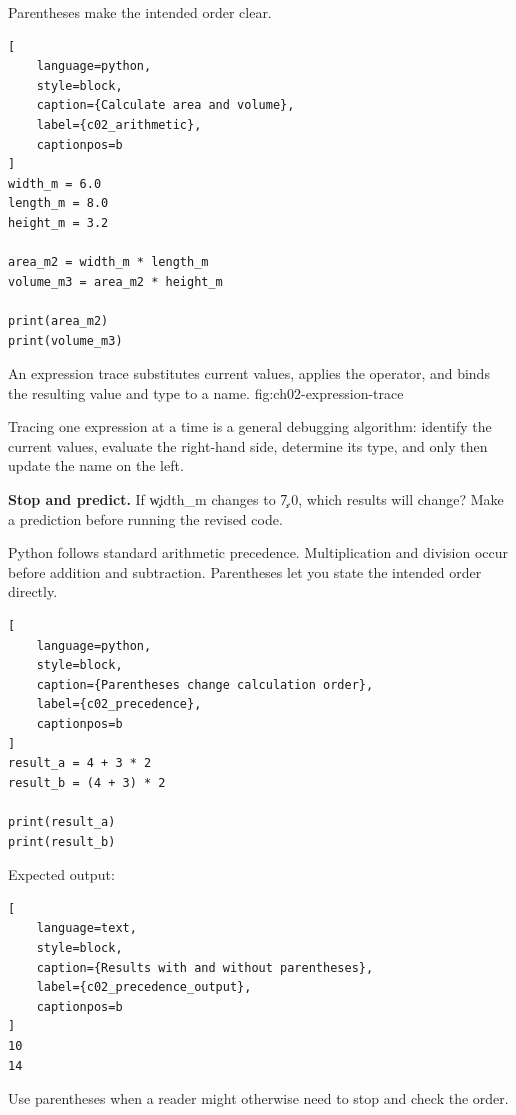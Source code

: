 Parentheses make the intended order clear.

\begin{lstlisting}[
    language=python,
    style=block,
    caption={Calculate area and volume},
    label={c02_arithmetic},
    captionpos=b
]
width_m = 6.0
length_m = 8.0
height_m = 3.2

area_m2 = width_m * length_m
volume_m3 = area_m2 * height_m

print(area_m2)
print(volume_m3)
\end{lstlisting}

{An expression trace substitutes current values, applies the operator, and binds the resulting value and type to a name.}
{fig:ch02-expression-trace}

Tracing one expression at a time is a general debugging algorithm: identify
the current values, evaluate the right-hand side, determine its type, and only
then update the name on the left.

\begin{NoteBox}
\textbf{Stop and predict.} If \c{width_m} changes to \c{7.0}, which results
will change? Make a prediction before running the revised code.
\end{NoteBox}


Python follows standard arithmetic precedence. Multiplication and division
occur before addition and subtraction. Parentheses let you state the intended
order directly.

\begin{lstlisting}[
    language=python,
    style=block,
    caption={Parentheses change calculation order},
    label={c02_precedence},
    captionpos=b
]
result_a = 4 + 3 * 2
result_b = (4 + 3) * 2

print(result_a)
print(result_b)
\end{lstlisting}

Expected output:

\begin{lstlisting}[
    language=text,
    style=block,
    caption={Results with and without parentheses},
    label={c02_precedence_output},
    captionpos=b
]
10
14
\end{lstlisting}

Use parentheses when a reader might otherwise need to stop and check the
order.


